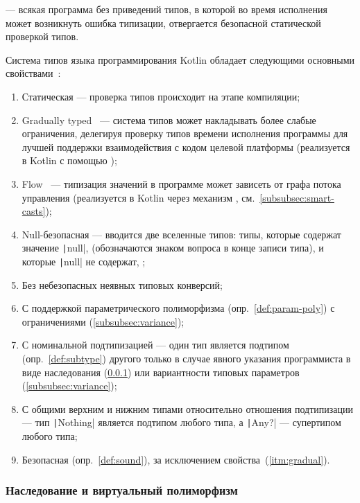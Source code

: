 \begin{definition}
    \label{def:sound}
     --- всякая программа без приведений типов, в которой во время исполнения может возникнуть ошибка типизации, отвергается безопасной статической проверкой типов.
\end{definition}

Система типов языка программирования Kotlin обладает следующими основными свойствами~\cite{akhin2021kotlin}:
\begin{enumerate}
    \item Статическая --- проверка типов происходит на этапе компиляции;
    \item\label{itm:gradual} Gradually typed~\cite{siek2007gradual} --- система типов может накладывать более слабые ограничения, делегируя проверку типов времени исполнения программы для лучшей поддержки взаимодействия с кодом целевой платформы (реализуется в Kotlin с помощью );
    \item Flow~\cite{pearce2013calculus} --- типизация значений в программе может зависеть от графа потока управления (реализуется в Kotlin через механизм , см.~\ref{subsubsec:smart-casts});
    \item Null-безопасная --- вводится две вселенные типов: типы, которые содержат значение \texttt|null|,  (обозначаются знаком вопроса в конце записи типа), и которые \texttt|null| не содержат, ;
    \item Без небезопасных неявных типовых конверсий;
    \item С поддержкой параметрического полиморфизма (опр.~\ref{def:param-poly}) с ограничениями (\ref{subsubsec:variance});
    \item С номинальной подтипизацией --- один тип является подтипом (опр.~\ref{def:subtype}) другого только в случае явного указания программиста в виде наследования (\ref{subsubsec:interitance-virtual}) или вариантности типовых параметров (\ref{subsubsec:variance});
    \item С общими верхним и нижним типами относительно отношения подтипизации --- тип \texttt|Nothing| является подтипом любого типа, а \texttt|Any?| --- супертипом любого типа;
    \item Безопасная (опр.~\ref{def:sound}), за исключением свойства~(\ref{itm:gradual}).
\end{enumerate}

\subsubsection{Наследование и виртуальный полиморфизм} \label{subsubsec:interitance-virtual}

